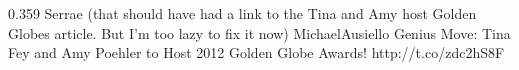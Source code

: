 {0.359}
{\joinNameTweet
{Serrae}
{(that should have had a link to the Tina and Amy host Golden Globes article. But I'm too lazy to fix it now)}}
{\joinNameTweet
{MichaelAusiello}
{Genius Move: Tina Fey and Amy Poehler to Host 2012 Golden Globe Awards! http://t.co/zdc2hS8F}}
%
%
%
%
%
%
%
%
%
%
